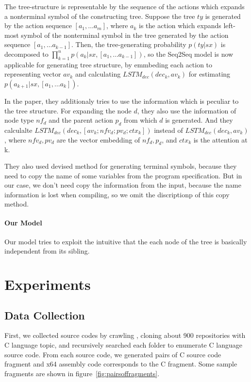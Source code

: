 \documentclass[senior,final,11pt]{iscs-thesis}
\begin{document}
The tree-structure is representable by the sequence of the actions which expands a nonterminal symbol of the constructing tree.
Suppose the tree $ty$ is generated by the action sequence $ [a_1, \dots a_m] $, 
where $ a_k $ is the action which expands left-most symbol of the nonterminal symbol in the tree generated by the action sequence $ [a_1, \dots a_{k-1}] $. 
Then, the tree-generating probability $ p(ty|sx) $ is decomposed to $ \prod_{k=1}^n p(a_k|sx,[a_1, \dots a_{k-1}]) $, 
so the Seq2Seq model is now applicable for generating tree structure, by emmbeding each action to representing vector $av_k$ and 
calculating $ LSTM_{dec}(dec_{k},av_{k}) $ for estimating $p(a_{k+1}|sx,[a_1, \dots a_{k}]) $.  

In the paper, they additionaly tries to use the information which is peculiar to the tree structure. 
For expanding the node $d$, they also use the information of node type $ nf_{d} $ and the parent action $p_{d}$ from which $d$ is generated.
And they calculalte $ LSTM_{dec}(dec_{k},[av_{k}; nfv_{d}; pv_{d}; ctx_{k}]) $ instead of $ LSTM_{dec}(dec_{k},av_{k}) $, 
where $nfv_{d},pv_{d}$ are the vector embedding of $nf_{d},p_{d}$, and $ctx_{k}$ is the attention at k.

They also used devised method for generating terminal symbols, because they need to copy the name of some variables from the program specification.
But in our case, we don't need copy the information from the input, because the name information is lost when compiling, so we omit the discriptionp of this copy method.


\subsubsection{Our Model}
Our model tries to exploit the intuitive that the each node of the tree is basically independent from its sibling.










\chapter{Experiments}

\section{Data Collection}
First, we collected source codes by crawling \cite[GitHub]{github}, cloning about 900 repositories with C language topic, 
and recursively searched each folder to enumerate C language source code.
From each source code, we generated pairs of C source code fragment and x64 assembly code corresponds to the C fragment.
Some sample fragments are shown in figure~\ref{fig:pairsoffragments}. 
\end{document}
